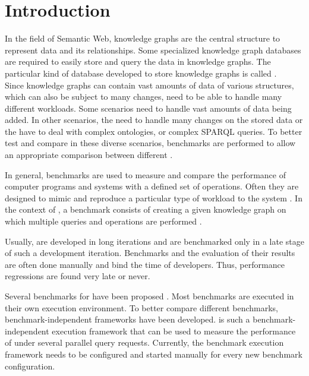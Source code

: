\chapter{Introduction}
\label{ch:introduction}




In the field of Semantic Web, knowledge graphs are the central structure to represent data and its relationships.
Some specialized knowledge graph databases are required to easily store and query the data in knowledge graphs.
The particular kind of database developed to store knowledge graphs is called \tsp{}. \\

Since knowledge graphs can contain vast amounts of data of various structures, which can also be subject to many changes, \tsp{} need to be able to handle many different workloads.
Some scenarios need to handle vast amounts of data being added.
In other scenarios, the \tsp{} need to handle many changes on the stored data or the \tsp{} have to deal with complex ontologies, or complex SPARQL queries.
To better test and compare \tsp{} in these diverse scenarios, benchmarks are performed to allow an appropriate comparison between different \tsp{} \cite{saleemHowRepresentativeSPARQL2019}.

In general, benchmarks are used to measure and compare the performance of computer programs and systems with a defined set of operations.
Often they are designed to mimic and reproduce a particular type of workload to the system \cite{saleemFEASIBLEFeatureBasedSPARQL2015, morseyDBpediaSPARQLBenchmark2011}.
In the context of \tsp{}, a benchmark consists of creating a given knowledge graph on which multiple queries and operations are performed \cite{conradsIguanaGenericFramework2017}.

Usually, \tsp{} are developed in long iterations and are benchmarked only in a late stage of such a development iteration.
Benchmarks and the evaluation of their results are often done manually and bind the time of developers.
Thus, performance regressions are found very late or never.


Several benchmarks for \tsp{} have been proposed \cite{saleemHowRepresentativeSPARQL2019}.
Most benchmarks are executed in their own execution environment.
To better compare different benchmarks, benchmark-independent frameworks have been developed.
\iguana{} is such a benchmark-independent execution framework \cite{conradsIguanaGenericFramework2017} that can be used to measure the performance of \tsp{} under several parallel query requests.
Currently, the benchmark execution framework needs to be configured and started manually for every new benchmark configuration.

